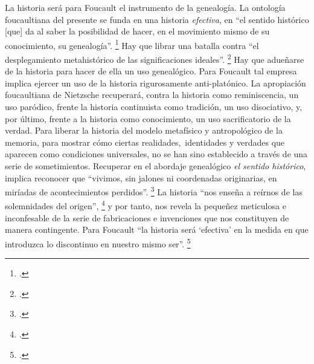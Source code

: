 La historia será para Foucault el instrumento de la genealogía. La ontología foucaultiana del presente se funda en una historia \emph{efectiva}, en \enquote{el sentido histórico {[}que{]} da al saber la posibilidad de hacer, en el movimiento mismo de su conocimiento, su genealogía}. \footcite[][54]{@7047-FOUCAULT2008} Hay que librar una batalla contra \enquote{el desplegamiento metahistórico de las significaciones ideales}. \footcite[][13]{@7047-FOUCAULT2008} Hay que adueñarse de la historia para hacer de ella un uso genealógico. Para Foucault tal empresa implica ejercer un uso de la historia rigurosamente anti-platónico. La apropiación foucaultiana de Nietzsche recuperará, contra la historia como reminiscencia, un uso paródico, frente la historia continuista como tradición, un uso disociativo, y, por último, frente a la historia como conocimiento, un uso sacrificatorio de la verdad. Para liberar la historia del modelo metafísico y antropológico de la memoria, para mostrar cómo ciertas realida\-des,~identidades y verdades que aparecen como condiciones universales, no se han sino establecido a través de una serie de sometimientos. Recuperar en el abordaje genealógico \emph{el sentido histórico}, implica reconocer que \enquote{vivimos, sin jalones ni coordenadas originarias, en miríadas de acontecimientos perdidos}. \footcite[][50-51]{@7047-FOUCAULT2008} La historia \enquote{nos enseña a reírnos de las solemnidades del origen}, \footcite[][19]{@7047-FOUCAULT2008} y por tanto, nos revela la pequeñez meticulosa e inconfesable de la serie de fabricaciones e invenciones que nos constituyen de manera contingente. Para Foucault \enquote{la historia será \enquote{efectiva} en la medida en que introduzca lo discontinuo en nuestro mismo ser}. \footcite[][47]{@7047-FOUCAULT2008}

